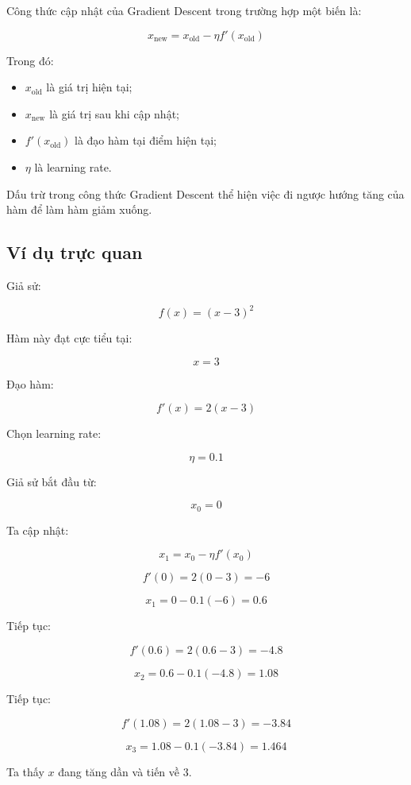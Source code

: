 Công thức cập nhật của Gradient Descent trong trường hợp một biến là:

\[
    x_{\text{new}}
    =
    x_{\text{old}}
    -
    \eta f'(x_{\text{old}})
\]

Trong đó:

\begin{itemize}
    \item $x_{\text{old}}$ là giá trị hiện tại;
    \item $x_{\text{new}}$ là giá trị sau khi cập nhật;
    \item $f'(x_{\text{old}})$ là đạo hàm tại điểm hiện tại;
    \item $\eta$ là learning rate.
\end{itemize}

\begin{ghinho}
Dấu trừ trong công thức Gradient Descent thể hiện việc đi ngược hướng tăng của hàm để làm hàm giảm xuống.
\end{ghinho}

\subsection{Ví dụ trực quan}

Giả sử:

\[
    f(x) = (x-3)^2
\]

Hàm này đạt cực tiểu tại:

\[
    x=3
\]

Đạo hàm:

\[
    f'(x)=2(x-3)
\]

Chọn learning rate:

\[
    \eta = 0.1
\]

Giả sử bắt đầu từ:

\[
    x_0 = 0
\]

Ta cập nhật:

\[
    x_{1}=x_0-\eta f'(x_0)
\]

\[
    f'(0)=2(0-3)=-6
\]

\[
    x_1=0-0.1(-6)=0.6
\]

Tiếp tục:

\[
    f'(0.6)=2(0.6-3)=-4.8
\]

\[
    x_2=0.6-0.1(-4.8)=1.08
\]

Tiếp tục:

\[
    f'(1.08)=2(1.08-3)=-3.84
\]

\[
    x_3=1.08-0.1(-3.84)=1.464
\]

Ta thấy $x$ đang tăng dần và tiến về 3.

